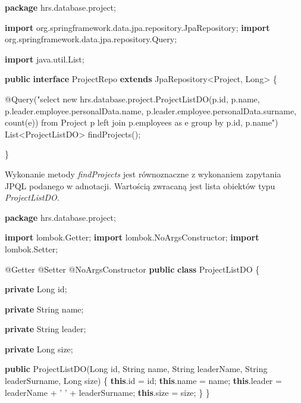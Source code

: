 \documentclass[]{article}
\newenvironment{Shaded}{}{}
\newcommand{\AttributeTok}[1]{\textcolor[rgb]{0.49,0.56,0.16}{#1}}
\newcommand{\BuiltInTok}[1]{#1}
\newcommand{\CharTok}[1]{\textcolor[rgb]{0.25,0.44,0.63}{#1}}
\newcommand{\FunctionTok}[1]{\textcolor[rgb]{0.02,0.16,0.49}{#1}}
\newcommand{\ImportTok}[1]{#1}
\newcommand{\KeywordTok}[1]{\textcolor[rgb]{0.00,0.44,0.13}{\textbf{#1}}}
\newcommand{\NormalTok}[1]{#1}
\newcommand{\StringTok}[1]{\textcolor[rgb]{0.25,0.44,0.63}{#1}}
\begin{document}
\begin{Shaded}
\begin{Highlighting}[]
\KeywordTok{package}\ImportTok{ hrs.database.project;}

\KeywordTok{import}\ImportTok{ org.springframework.data.jpa.repository.JpaRepository;}
\KeywordTok{import}\ImportTok{ org.springframework.data.jpa.repository.Query;}

\KeywordTok{import}\ImportTok{ java.util.List;}

\KeywordTok{public} \KeywordTok{interface}\NormalTok{ ProjectRepo }\KeywordTok{extends}\NormalTok{ JpaRepository<Project, }\BuiltInTok{Long}\NormalTok{> \{}

    \AttributeTok{@Query}\NormalTok{(}\StringTok{"select new hrs.database.project.ProjectListDO(p.id, p.name, p.leader.employee.personalData.name, p.leader.employee.personalData.surname, count(e)) from Project p left join p.employees as e group by p.id, p.name"}\NormalTok{)}
    \BuiltInTok{List}\NormalTok{<ProjectListDO> }\FunctionTok{findProjects}\NormalTok{();}

\NormalTok{\}}
\end{Highlighting}
\end{Shaded}

Wykonanie metody \emph{findProjects} jest równoznaczne z wykonaniem
zapytania JPQL podanego w adnotacji. Wartością zwracaną jest lista
obiektów typu \emph{ProjectListDO}.

\begin{Shaded}
\begin{Highlighting}[]
\KeywordTok{package}\ImportTok{ hrs.database.project;}

\KeywordTok{import}\ImportTok{ lombok.Getter;}
\KeywordTok{import}\ImportTok{ lombok.NoArgsConstructor;}
\KeywordTok{import}\ImportTok{ lombok.Setter;}

\AttributeTok{@Getter}
\AttributeTok{@Setter}
\AttributeTok{@NoArgsConstructor}
\KeywordTok{public} \KeywordTok{class}\NormalTok{ ProjectListDO \{}

    \KeywordTok{private} \BuiltInTok{Long}\NormalTok{ id;}

    \KeywordTok{private} \BuiltInTok{String}\NormalTok{ name;}

    \KeywordTok{private} \BuiltInTok{String}\NormalTok{ leader;}

    \KeywordTok{private} \BuiltInTok{Long}\NormalTok{ size;}

    \KeywordTok{public} \FunctionTok{ProjectListDO}\NormalTok{(}\BuiltInTok{Long}\NormalTok{ id, }\BuiltInTok{String}\NormalTok{ name, }\BuiltInTok{String}\NormalTok{ leaderName, }\BuiltInTok{String}\NormalTok{ leaderSurname, }\BuiltInTok{Long}\NormalTok{ size) \{}
        \KeywordTok{this}\NormalTok{.}\FunctionTok{id}\NormalTok{ = id;}
        \KeywordTok{this}\NormalTok{.}\FunctionTok{name}\NormalTok{ = name;}
        \KeywordTok{this}\NormalTok{.}\FunctionTok{leader}\NormalTok{ = leaderName + }\CharTok{' '}\NormalTok{ + leaderSurname;}
        \KeywordTok{this}\NormalTok{.}\FunctionTok{size}\NormalTok{ = size;}
\NormalTok{    \}}
\NormalTok{\}}
\end{Highlighting}
\end{Shaded}
\end{document}
